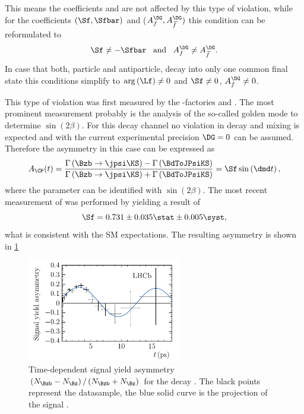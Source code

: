This means the \CP coefficients \Cf and \Cfbar are not affected by this type of \CP violation, while for the coefficients $(\Sf, \Sfbar)$ and  ($A_f^{\DG}, A_{\kern 1.5pt\overline{\kern -1.5pt f\kern 1.5pt}}^{\DG})$ this condition can be reformulated to
\begin{equation}
\Sf\neq-\Sfbar\,\,\,\,\,\text{and}\,\,\,\,\,A_f^{\DG}\neq A_{\kern 1.5pt\overline{\kern -1.5pt f\kern 1.5pt}}^{\DG}.
\end{equation}
In case that both, particle and antiparticle, decay into only one common final state this conditions simplify to $\arg\left(\Lf\right)\neq0$ and $\Sf\neq0$, $A_f^{\DG}\neq0$.

This type of \CP violation was first measured by the \B-factories \babar \cite{Aubert:2001nu} and \belle \cite{Abe:2001xe}.
The most prominent measurement probably is the analysis of the so-called golden mode \BdToJPsiKS to determine $\sin\!\left(2\beta\right)$.
For this decay channel no \CP violation in decay and mixing is expected and with the current experimental precision $\DG=0$ can be assumed.
Therefore the \CP asymmetry in this case can be expressed as
\begin{equation}
A_{\CP}(t)=\frac{\Gamma\left(\Bzb\to\jpsi\KS\right)-\Gamma\left(\BdToJPsiKS\right)}{\Gamma\left(\Bzb\to\jpsi\KS\right)+\Gamma\left(\BdToJPsiKS\right)}=\Sf\sin\left(\dmd t\right),\label{eq:CPAsymBd2JpsiKS}
\end{equation}
where the parameter \Sf can be identified with $\sin{}\left(2\beta\right)$.
The most recent measurement of \Sf was performed by \lhcb \cite{Aaij:2015vza} yielding a result of
\begin{equation}
\Sf=0.731\pm0.035\stat\pm0.005\syst,
\end{equation}
what is consistent with the \ac{SM} expectations. The resulting \CP asymmetry is shown in \cref{fig:sin2beta}
\begin{figure}[tbp]
	\centering
	\includegraphics[width=0.6\textwidth]{03CPV/figs/InterferenceCPV.pdf}
	\caption{Time-dependent signal yield asymmetry $\left(N_{\Bzb}-N_{\Bz}\right)/\left(N_{\Bzb}+N_{\Bz}\right)$ for the decay \BdToJPsiKS.
	The black points represent the datasample, the blue solid curve is the projection of the signal \PDF.}
	\label{fig:sin2beta}
\end{figure}
